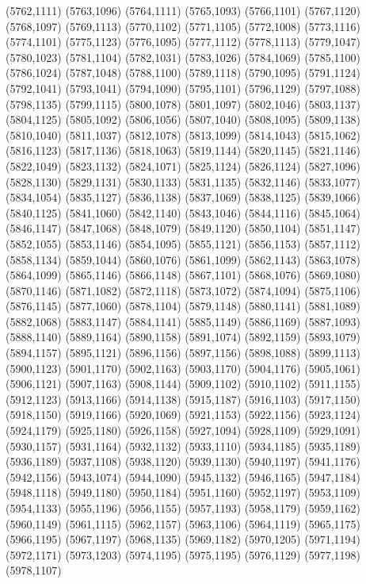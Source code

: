 (5762,1111)
(5763,1096)
(5764,1111)
(5765,1093)
(5766,1101)
(5767,1120)
(5768,1097)
(5769,1113)
(5770,1102)
(5771,1105)
(5772,1008)
(5773,1116)
(5774,1101)
(5775,1123)
(5776,1095)
(5777,1112)
(5778,1113)
(5779,1047)
(5780,1023)
(5781,1104)
(5782,1031)
(5783,1026)
(5784,1069)
(5785,1100)
(5786,1024)
(5787,1048)
(5788,1100)
(5789,1118)
(5790,1095)
(5791,1124)
(5792,1041)
(5793,1041)
(5794,1090)
(5795,1101)
(5796,1129)
(5797,1088)
(5798,1135)
(5799,1115)
(5800,1078)
(5801,1097)
(5802,1046)
(5803,1137)
(5804,1125)
(5805,1092)
(5806,1056)
(5807,1040)
(5808,1095)
(5809,1138)
(5810,1040)
(5811,1037)
(5812,1078)
(5813,1099)
(5814,1043)
(5815,1062)
(5816,1123)
(5817,1136)
(5818,1063)
(5819,1144)
(5820,1145)
(5821,1146)
(5822,1049)
(5823,1132)
(5824,1071)
(5825,1124)
(5826,1124)
(5827,1096)
(5828,1130)
(5829,1131)
(5830,1133)
(5831,1135)
(5832,1146)
(5833,1077)
(5834,1054)
(5835,1127)
(5836,1138)
(5837,1069)
(5838,1125)
(5839,1066)
(5840,1125)
(5841,1060)
(5842,1140)
(5843,1046)
(5844,1116)
(5845,1064)
(5846,1147)
(5847,1068)
(5848,1079)
(5849,1120)
(5850,1104)
(5851,1147)
(5852,1055)
(5853,1146)
(5854,1095)
(5855,1121)
(5856,1153)
(5857,1112)
(5858,1134)
(5859,1044)
(5860,1076)
(5861,1099)
(5862,1143)
(5863,1078)
(5864,1099)
(5865,1146)
(5866,1148)
(5867,1101)
(5868,1076)
(5869,1080)
(5870,1146)
(5871,1082)
(5872,1118)
(5873,1072)
(5874,1094)
(5875,1106)
(5876,1145)
(5877,1060)
(5878,1104)
(5879,1148)
(5880,1141)
(5881,1089)
(5882,1068)
(5883,1147)
(5884,1141)
(5885,1149)
(5886,1169)
(5887,1093)
(5888,1140)
(5889,1164)
(5890,1158)
(5891,1074)
(5892,1159)
(5893,1079)
(5894,1157)
(5895,1121)
(5896,1156)
(5897,1156)
(5898,1088)
(5899,1113)
(5900,1123)
(5901,1170)
(5902,1163)
(5903,1170)
(5904,1176)
(5905,1061)
(5906,1121)
(5907,1163)
(5908,1144)
(5909,1102)
(5910,1102)
(5911,1155)
(5912,1123)
(5913,1166)
(5914,1138)
(5915,1187)
(5916,1103)
(5917,1150)
(5918,1150)
(5919,1166)
(5920,1069)
(5921,1153)
(5922,1156)
(5923,1124)
(5924,1179)
(5925,1180)
(5926,1158)
(5927,1094)
(5928,1109)
(5929,1091)
(5930,1157)
(5931,1164)
(5932,1132)
(5933,1110)
(5934,1185)
(5935,1189)
(5936,1189)
(5937,1108)
(5938,1120)
(5939,1130)
(5940,1197)
(5941,1176)
(5942,1156)
(5943,1074)
(5944,1090)
(5945,1132)
(5946,1165)
(5947,1184)
(5948,1118)
(5949,1180)
(5950,1184)
(5951,1160)
(5952,1197)
(5953,1109)
(5954,1133)
(5955,1196)
(5956,1155)
(5957,1193)
(5958,1179)
(5959,1162)
(5960,1149)
(5961,1115)
(5962,1157)
(5963,1106)
(5964,1119)
(5965,1175)
(5966,1195)
(5967,1197)
(5968,1135)
(5969,1182)
(5970,1205)
(5971,1194)
(5972,1171)
(5973,1203)
(5974,1195)
(5975,1195)
(5976,1129)
(5977,1198)
(5978,1107)
